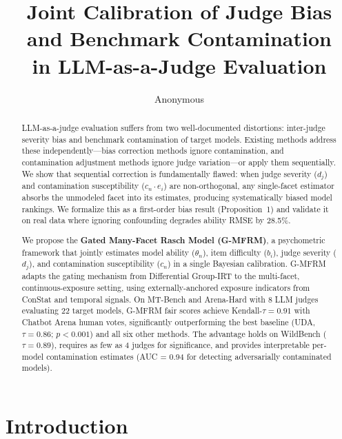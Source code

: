 \documentclass[11pt,a4paper]{article}
\title{Joint Calibration of Judge Bias and Benchmark Contamination\\in LLM-as-a-Judge Evaluation}
\author{Anonymous}
\date{}
\begin{document}
\maketitle

\begin{abstract}
LLM-as-a-judge evaluation suffers from two well-documented distortions: inter-judge severity bias and benchmark contamination of target models. Existing methods address these independently---bias correction methods ignore contamination, and contamination adjustment methods ignore judge variation---or apply them sequentially. We show that sequential correction is fundamentally flawed: when judge severity ($d_j$) and contamination susceptibility ($c_n \cdot e_i$) are non-orthogonal, any single-facet estimator absorbs the unmodeled facet into its estimates, producing systematically biased model rankings. We formalize this as a first-order bias result (Proposition~1) and validate it on real data where ignoring confounding degrades ability RMSE by 28.5\%.

We propose the \textbf{Gated Many-Facet Rasch Model (G-MFRM)}, a psychometric framework that jointly estimates model ability ($\theta_n$), item difficulty ($b_i$), judge severity ($d_j$), and contamination susceptibility ($c_n$) in a single Bayesian calibration. G-MFRM adapts the gating mechanism from Differential Group-IRT to the multi-facet, continuous-exposure setting, using externally-anchored exposure indicators from ConStat and temporal signals. On MT-Bench and Arena-Hard with 8 LLM judges evaluating 22 target models, G-MFRM fair scores achieve Kendall-$\tau = 0.91$ with Chatbot Arena human votes, significantly outperforming the best baseline (UDA, $\tau = 0.86$; $p < 0.001$) and all six other methods. The advantage holds on WildBench ($\tau = 0.89$), requires as few as 4 judges for significance, and provides interpretable per-model contamination estimates (AUC = 0.94 for detecting adversarially contaminated models).
\end{abstract}

\section{Introduction}
\end{document}
